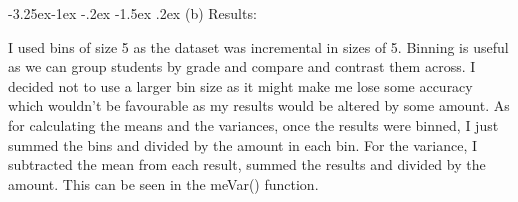 \documentclass[10pt]{article} %
\makeatletter
\renewcommand\subsection{\@startsection{subsection}{2}{\z@}%
                                     {-3.25ex\@plus -1ex \@minus -.2ex}%
                                     {-1.5ex \@plus .2ex}%
                                     {\normalfont\large\bfseries}}
\makeatother
\begin{document}
\subsection{(b)}
Results:
\newline

I used bins of size 5 as the dataset was incremental in sizes of 5. Binning is useful as we can group students by grade and compare and contrast them across. I decided not to use a larger bin size as it might make me lose some accuracy which wouldn't be favourable as my results would be altered by some amount. As for calculating the means and the variances, once the results were binned, I just summed the bins and divided by the amount in each bin. For the variance, I subtracted the mean from each result, summed the results and divided by the amount. This can be seen in the meVar() function.
\end{document}
